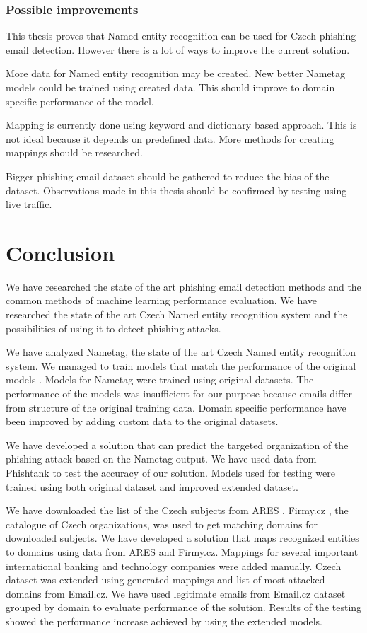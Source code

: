 \documentclass[thesis=B,english]{FITthesis}[2012/10/20]
\begin{document}
\subsection{Possible improvements}

This thesis proves that Named entity recognition can be used for Czech phishing email detection.
However there is a lot of ways to improve the current solution. 

More data for Named entity recognition may be created.
New better Nametag models could be trained using created data.
This should improve to domain specific performance of the model.

Mapping is currently done using keyword and dictionary based approach.
This is not ideal because it depends on predefined data.
More methods for creating mappings should be researched.

Bigger phishing email dataset should be gathered to reduce the bias of the dataset.
Observations made in this thesis should be confirmed by testing using live traffic.

\chapter{Conclusion}


We have researched the state of the art phishing email detection methods and the common methods of machine learning performance evaluation.
We have researched the state of the art Czech Named entity recognition system and the possibilities of using it to detect phishing attacks.

We have analyzed Nametag, the state of the art Czech Named entity recognition system. We managed to train models that match the performance of the original models \cite{stateOfTheArtCzechNER}.
Models for Nametag were trained using original datasets. The performance of the models was insufficient for our purpose because emails differ from structure of the original training data.
Domain specific performance have been improved by adding custom data to the original datasets. 

We have developed a solution that can predict the targeted organization of the phishing attack based on the Nametag output. 
We have used data from Phishtank \cite{phishtank} to test the accuracy of our solution. Models used for testing were trained using both original dataset and improved extended dataset. 

We have downloaded the list of the Czech subjects from ARES \cite{opendata_orgs}.
Firmy.cz \cite{firmycz}, the catalogue of Czech organizations, was used to get matching domains for downloaded subjects. 
We have developed a solution that maps recognized entities to domains using data from ARES and Firmy.cz.
Mappings for several important international banking and technology companies were added manually.
Czech dataset was extended using generated mappings and list of most attacked domains from Email.cz.
We have used legitimate emails from Email.cz dataset grouped by domain to evaluate performance of the solution.
Results of the testing showed the performance increase achieved by using the extended models.
\end{document}
